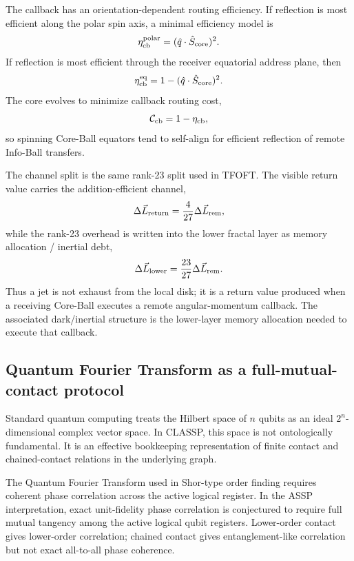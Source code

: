 \documentclass[11pt,a4paper]{article}
\begin{document}
The callback has an orientation-dependent routing efficiency.  If reflection is
most efficient along the polar spin axis, a minimal efficiency model is
\begin{equation}
  \eta_{\rm cb}^{\rm polar}=(\hat q\cdot\hat S_{\rm core})^2.
  \label{eq:callback_eff_polar}
\end{equation}
If reflection is most efficient through the receiver equatorial address plane,
then
\begin{equation}
  \eta_{\rm cb}^{\rm eq}=1-(\hat q\cdot\hat S_{\rm core})^2.
  \label{eq:callback_eff_equator}
\end{equation}
The core evolves to minimize callback routing cost,
\begin{equation}
  \mathcal C_{\rm cb}=1-\eta_{\rm cb},
  \label{eq:callback_cost}
\end{equation}
so spinning Core-Ball equators tend to self-align for efficient reflection of
remote Info-Ball transfers.

The channel split is the same rank-23 split used in TFOFT.  The visible return
value carries the addition-efficient channel,
\begin{equation}
  \Delta\vec L_{\rm return}=\frac{4}{27}\Delta\vec L_{\rm rem},
  \label{eq:return_channel_427}
\end{equation}
while the rank-23 overhead is written into the lower fractal layer as memory
allocation / inertial debt,
\begin{equation}
  \Delta\vec L_{\rm lower}=\frac{23}{27}\Delta\vec L_{\rm rem}.
  \label{eq:lower_channel_2327}
\end{equation}
Thus a jet is not exhaust from the local disk; it is a return value produced
when a receiving Core-Ball executes a remote angular-momentum callback.  The
associated dark/inertial structure is the lower-layer memory allocation needed
to execute that callback.

\subsection{Quantum Fourier Transform as a full-mutual-contact protocol}

Standard quantum computing treats the Hilbert space of \(n\) qubits as an
ideal \(2^n\)-dimensional complex vector space.  In CLASSP, this space is not
ontologically fundamental.  It is an effective bookkeeping representation of
finite contact and chained-contact relations in the underlying graph.

The Quantum Fourier Transform used in Shor-type order finding requires
coherent phase correlation across the active logical register.  In the ASSP
interpretation, exact unit-fidelity phase correlation is conjectured to require
full mutual tangency among the active logical qubit registers.  Lower-order
contact gives lower-order correlation; chained contact gives
entanglement-like correlation but not exact all-to-all phase coherence.
\end{document}
